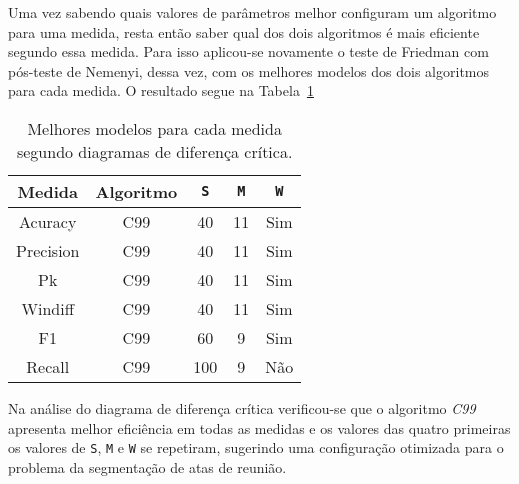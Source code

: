 Uma vez sabendo quais valores de parâmetros melhor configuram um algoritmo para uma medida, resta então saber qual dos dois algoritmos é mais eficiente segundo essa medida. Para isso aplicou-se novamente o teste de Friedman com pós-teste de Nemenyi, dessa vez, com os melhores modelos dos dois algoritmos para cada medida. O resultado segue na Tabela~\ref{tab:melhoresmodelos}

\begin{table}[!h]
	\centering
	
	\begin{tabular}{|c|c|c|c|c|}

		\hline
		Medida & Algoritmo & \texttt{S} & \texttt{M} & \texttt{W}\\		
		\hline
		
	
		Acuracy		& C99 & 40 	& 11	& Sim \\ \hline
		Precision	& C99 & 40 	& 11	& Sim \\ \hline
		Pk			& C99 & 40 	& 11	& Sim \\ \hline
		Windiff		& C99 & 40 	& 11	& Sim \\ \hline
		F1			& C99 & 60 	& 9		& Sim \\ \hline
		Recall		& C99 & 100 & 9		& Não \\ \hline
 	
	
	\end{tabular}

	\caption{Melhores modelos para cada medida segundo diagramas de diferença crítica.}
	\label{tab:melhoresmodelos}	
	
\end{table}


Na análise do diagrama de diferença crítica verificou-se que o algoritmo \textit{C99} apresenta melhor eficiência em todas as medidas e os valores das quatro primeiras os valores de \texttt{S}, \texttt{M} e \texttt{W} se repetiram, sugerindo uma configuração otimizada para o problema da segmentação de atas de reunião.





